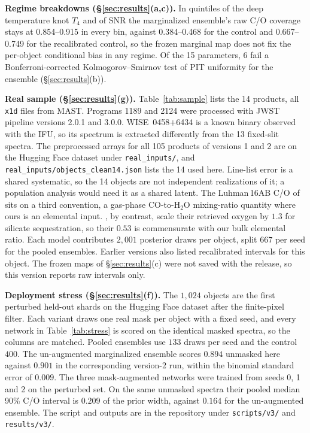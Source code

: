 \documentclass{article}
\begin{document}
\textbf{Regime breakdowns (\S\ref{sec:results}(a,c)).} In quintiles of the deep
temperature knot $T_4$ and of SNR the marginalized ensemble's raw C/O coverage
stays at 0.854--0.915 in every bin, against 0.384--0.468 for the control and
0.667--0.749 for the recalibrated control, so the frozen marginal map does not
fix the per-object conditional bias in any regime. Of the 15 parameters, 6 fail
a Bonferroni-corrected Kolmogorov--Smirnov test of PIT uniformity for the
ensemble (\S\ref{sec:results}(b)).

\textbf{Real sample (\S\ref{sec:results}(g)).} Table~\ref{tab:sample} lists
the 14 products, all \texttt{x1d} files from MAST. Programs 1189 and 2124 were
processed with JWST pipeline versions 2.0.1 and 3.0.0. WISE~0458$+$6434 is a
known binary observed with the IFU, so its spectrum is extracted differently
from the 13 fixed-slit spectra. The preprocessed arrays for all 105 products
of versions 1 and 2 are on the Hugging Face dataset under
\texttt{real\_inputs/}, and \texttt{real\_inputs/objects\_clean14.json} lists
the 14 used here. Line-list error is a shared systematic, so the 14 objects are
not independent realizations of it; a population analysis would need it as a
shared latent. The Luhman\,16AB C/O of \citet{yama2026} sits on a third
convention, a gas-phase CO-to-H$_2$O mixing-ratio quantity where ours is an
elemental input. \citet{hood2024}, by contrast, scale their retrieved oxygen by
$1.3$ for silicate sequestration, so their $0.53$ is commensurate with our bulk
elemental ratio. Each model contributes $2{,}001$ posterior draws per object,
split $667$ per seed for the pooled ensembles. Earlier versions also listed recalibrated
intervals for this object. The frozen maps of \S\ref{sec:results}(c) were not
saved with the release, so this version reports raw intervals only.

\textbf{Deployment stress (\S\ref{sec:results}(f)).} The $1{,}024$ objects are
the first perturbed held-out shards on the Hugging Face dataset after the
finite-pixel filter. Each variant draws one real mask per object with a fixed
seed, and every network in Table~\ref{tab:stress} is scored on the identical
masked spectra, so the columns are matched. Pooled ensembles use $133$ draws per
seed and the control $400$. The un-augmented marginalized ensemble scores $0.894$
unmasked here against $0.901$ in the corresponding version-2 run, within the
binomial standard error of $0.009$. The three mask-augmented networks were
trained from seeds 0, 1 and 2 on the perturbed set. On the same unmasked spectra
their pooled median 90\% C/O interval is $0.209$ of the prior width, against
$0.164$ for the un-augmented ensemble. The script and outputs are in the repository under
\texttt{scripts/v3/} and \texttt{results/v3/}.
\end{document}
